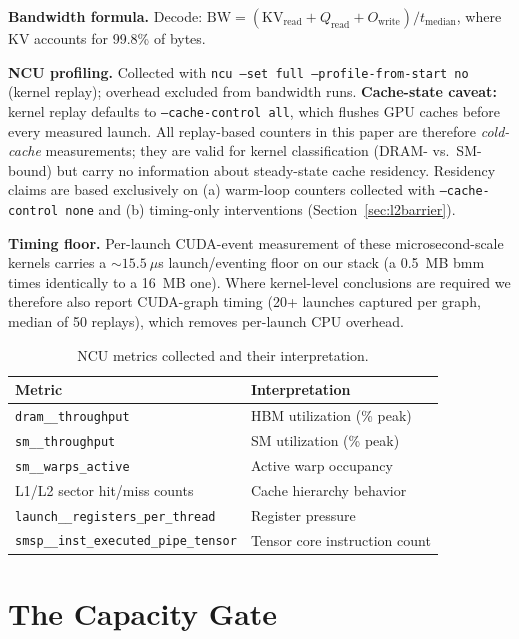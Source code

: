 \documentclass[10pt,twocolumn]{article}
\begin{document}
\textbf{Bandwidth formula.}  Decode: $\text{BW} = (\text{KV}_\text{read} + Q_\text{read} + O_\text{write}) / t_\text{median}$, where KV accounts for 99.8\% of bytes.

\textbf{NCU profiling.}  Collected with \texttt{ncu --set full --profile-from-start no} (kernel replay); overhead excluded from bandwidth runs.  \textbf{Cache-state caveat:} kernel replay defaults to \texttt{--cache-control all}, which flushes GPU caches before every measured launch.  All replay-based counters in this paper are therefore \emph{cold-cache} measurements; they are valid for kernel classification (DRAM- vs.\ SM-bound) but carry no information about steady-state cache residency.  Residency claims are based exclusively on (a) warm-loop counters collected with \texttt{--cache-control none} and (b) timing-only interventions (Section~\ref{sec:l2barrier}).

\textbf{Timing floor.}  Per-launch CUDA-event measurement of these microsecond-scale kernels carries a ${\sim}15.5~\mu$s launch/eventing floor on our stack (a 0.5~MB bmm times identically to a 16~MB one).  Where kernel-level conclusions are required we therefore also report CUDA-graph timing (20+ launches captured per graph, median of 50 replays), which removes per-launch CPU overhead.

\begin{table}[h]
\centering
\small
\caption{NCU metrics collected and their interpretation.}
\label{tab:ncu_metrics}
\footnotesize
\begin{tabular}{@{}ll@{}}
\toprule
Metric & Interpretation \\
\midrule
\texttt{dram\_\_throughput}             & HBM utilization (\% peak) \\
\texttt{sm\_\_throughput}               & SM utilization (\% peak) \\
\texttt{sm\_\_warps\_active}            & Active warp occupancy \\
L1/L2 sector hit/miss counts           & Cache hierarchy behavior \\
\texttt{launch\_\_registers\_per\_thread} & Register pressure \\
\texttt{smsp\_\_inst\_executed\_pipe\_tensor} & Tensor core instruction count \\
\bottomrule
\end{tabular}
\end{table}

\section{The Capacity Gate}
\label{sec:gate}
\end{document}
